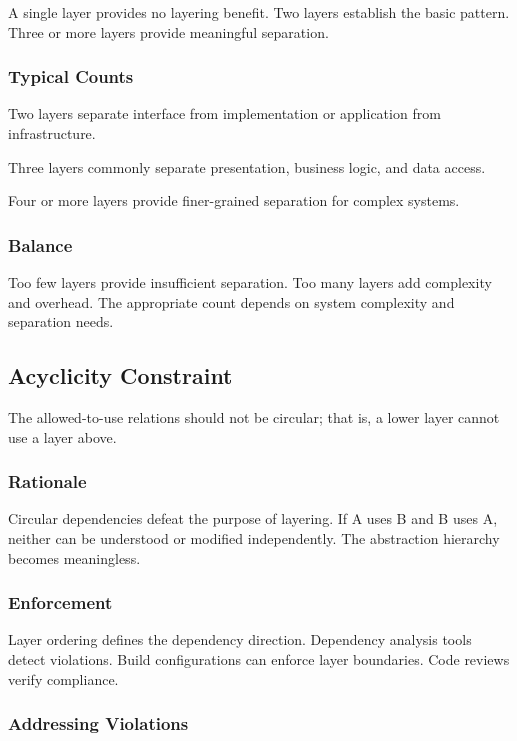 \documentclass[11pt]{article}
\begin{document}
A single layer provides no layering benefit. Two layers establish the basic pattern. Three or more layers provide meaningful separation.

\subsubsection{Typical Counts}

Two layers separate interface from implementation or application from infrastructure.

Three layers commonly separate presentation, business logic, and data access.

Four or more layers provide finer-grained separation for complex systems.

\subsubsection{Balance}

Too few layers provide insufficient separation. Too many layers add complexity and overhead. The appropriate count depends on system complexity and separation needs.

\subsection{Acyclicity Constraint}

The allowed-to-use relations should not be circular; that is, a lower layer cannot use a layer above.

\subsubsection{Rationale}

Circular dependencies defeat the purpose of layering. If A uses B and B uses A, neither can be understood or modified independently. The abstraction hierarchy becomes meaningless.

\subsubsection{Enforcement}

Layer ordering defines the dependency direction. Dependency analysis tools detect violations. Build configurations can enforce layer boundaries. Code reviews verify compliance.

\subsubsection{Addressing Violations}
\end{document}
